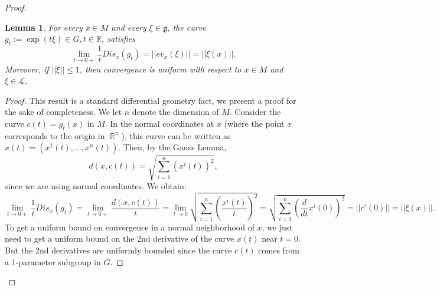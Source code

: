 \documentclass[12pt]{amsbook}%
\newtheorem{lem}[thm]{Lemma}
\theoremstyle{definition}
\theoremstyle{remark}
\numberwithin{section}{chapter}
\numberwithin{subsection}{section}
\numberwithin{figure}{chapter}
\DeclareMathOperator{\R}{\mathbb{R}}
\def\cL{{\mathscr{L}}}
\begin{document}
{{\begin{proof}
\begin{lem}\label{lem:E2}
For every $x\in M$ and every $\xi\in {\mathfrak g}$, the curve $g_t:=  \exp(t\xi)\in G, t\in \mathbb R$, satisfies 
$$
\lim_{t\to 0+} \frac{1}{t}Dis_{x}(g_t)= ||ev_x(\xi)||=||\xi(x)||. 
$$
Moreover, if $||\xi||\leqslant 1$, then convergence is uniform with respect to $x\in M$ and $\xi\in \cL$.  
\end{lem}  
\begin{proof} This result is a standard differential geometry fact, we present a proof for the sake of completeness. 
We let $n$ denote the dimension of $M$. 
Consider the curve $c(t)=g_t(x)$ in $M$.  In the normal coordinates at $x$ 
(where the point $x$ corresponds to the origin in $\R^n$), this curve can be written 
as $x(t)=(x^1(t),...,x^n(t))$. Then, by the Gauss Lemma,  
$$
d(x, c(t))= \sqrt{\sum_{i=1}^n (x^i(t))^2}, 
$$  
since we are using normal coordinates. We obtain: 
$$
\lim_{t\to 0+} \frac{1}{t}Dis_{x}(g_t)=\lim_{t\to 0+} \frac{d(x, c(t))}{t} = \lim_{t\to 0}  \sqrt{\sum_{i=1}^n \left(\frac{x^i(t)}{t}\right)^2}= 
 \sqrt{\sum_{i=1}^n \left(\frac{d}{dt}x^i(0)\right)^2}=||c'(0)||=||\xi(x)||. 
$$ 
To get a uniform bound on convergence in a normal neighborhood of $x$, 
we just need to get a uniform bound on the 2nd derivative of the curve $x(t)$ near $t=0$. But the 2nd derivatives are uniformly bounded since 
the curve $c(t)$ comes from a 1-parameter subgroup in $G$. 
\end{proof}



\end{proof}}}
\end{document}
